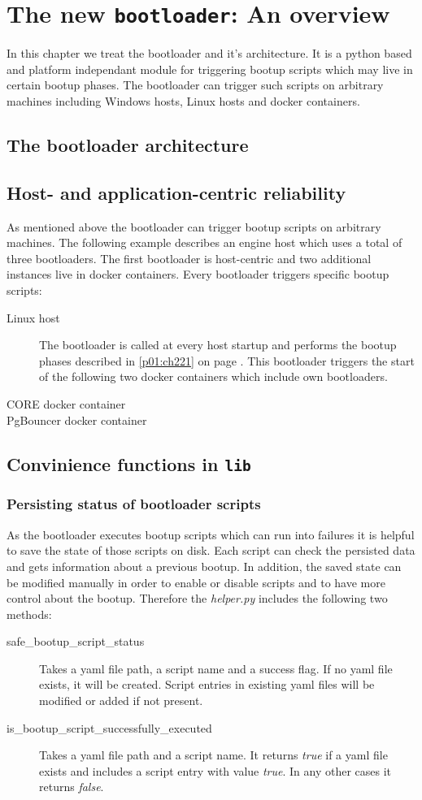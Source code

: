\chapter{The new \texttt{bootloader}: An overview}\label{p01:ch04}
In this chapter we treat the bootloader and it's architecture. It is a python based and platform independant module for triggering bootup scripts which may live in certain bootup phases. The bootloader can trigger such scripts on arbitrary machines including Windows hosts, Linux hosts and docker containers.
	\section{The bootloader architecture}
	\section{Host- and application-centric reliability}
	As mentioned above the bootloader can trigger bootup scripts on arbitrary machines. The following example describes an engine host which uses a total of three bootloaders. The first bootloader is host-centric and two additional instances live in docker containers. Every bootloader triggers specific bootup scripts:
	\begin{description}
		\item[Linux host] The bootloader is called at every host startup and performs the bootup phases described in \ref{p01:ch221} on page \pageref{p01:ch221}. This bootloader triggers the start of the following two docker containers which include own bootloaders.
		\item[CORE docker container]
		\item[PgBouncer docker container]
	\end{description}
	\section{Convinience functions in \texttt{lib}}
		\subsection{Persisting status of bootloader scripts}
		As the bootloader executes bootup scripts which can run into failures it is helpful to save the state of those scripts on disk. Each script can check the persisted data and gets information about a previous bootup. In addition, the saved state can be modified manually in order to enable or disable scripts and to have more control about the bootup. Therefore the \emph{helper.py} includes the following two methods:
		\begin{description}
			\item[safe\_bootup\_script\_status] Takes a yaml file path, a script name and a success flag. If no yaml file exists, it will be created. Script entries in existing yaml files will be modified or added if not present. 
			\item[is\_bootup\_script\_successfully\_executed] Takes a yaml file path and a script name. It returns \emph{true} if a yaml file exists and includes a script entry with value \emph{true}. In any other cases it returns \emph{false}.
		\end{description}
